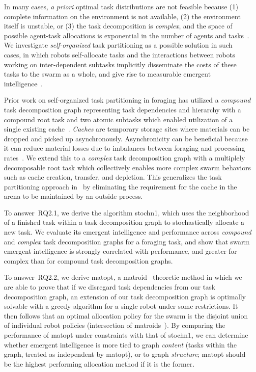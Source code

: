 In many cases, \emph{a priori} optimal task distributions are not feasible because
(1) complete information on the environment is not available, (2) the environment
itself is unstable\cite{Rouff2007a,Napp2014a}, or (3) the task decomposition is
\emph{complex}, and the space of possible agent-task allocations is exponential in
the number of agents and tasks~\cite{Korsah2013}. We investigate
\emph{self-organized} task partitioning as a possible solution in such cases, in
which robots self-allocate tasks and the interactions between robots working on
inter-dependent subtasks implicitly disseminate the costs of these tasks to the swarm
as a whole, and give rise to measurable emergent intelligence~\cite{Harwell2019a}.

Prior work on self-organized task partitioning in foraging has utilized a
\emph{compound} task decomposition graph representing task dependencies and hierarchy
with a compound root task and two atomic subtasks which enabled utilization of a
single existing
cache~\cite{Pini2011b,Pini2013a,Brutschy2014,Ferrante2015,Frison2010,Harwell2018}.
\emph{Caches} are temporary storage sites where materials can be dropped and picked
up asynchronously. Asynchronicity can be beneficial because it can reduce material
losses due to imbalances between foraging and processing rates~\cite{Hart2000}. We
extend this to a \emph{complex} task decomposition graph with a multiplely
decomposable root task which collectively enables more complex swarm behaviors such
as cache creation, transfer, and depletion. This generalizes the task partitioning
approach in~\cite{Harwell2018} by eliminating the requirement for the cache in the
arena to be maintained by an outside process.

To answer~\gls{RQ2.1}, we derive the algorithm \gls{stochn1}, which uses the
neighborhood of a finished task within a task decomposition graph to
stochastically allocate a new task. We evaluate its emergent intelligence and
performance across \emph{compound} and \emph{complex} task decomposition graphs
for a foraging task, and show that swarm emergent intelligence is strongly
correlated with performance, and greater for complex than for compound task
decomposition graphs.

To answer~\gls{RQ2.2}, we derive \gls{matopt}, a
matroid~\cite{Tutte1959,Whitney1935,Oxley2006} theoretic method in which we are
able to prove that if we disregard task dependencies from our task decomposition
graph, an extension of our task decomposition graph is optimally solvable with a
greedy algorithm for a single robot under some restrictions. It then follows
that an optimal allocation policy for the swarm is the disjoint union of
individual robot policies (intersection of matroids~\cite{Williams2017}). By
comparing the performance of \gls{matopt} under constraints with that of
\gls{stochn1}, we can determine whether emergent intelligence is more tied to
graph \emph{content} (tasks within the graph, treated as independent by
\gls{matopt}), or to graph \emph{structure}; \gls{matopt} should be the
highest performing allocation method if it is the former.

